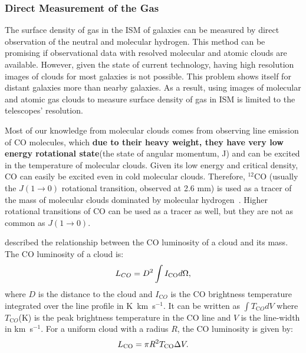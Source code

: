 \subsubsection{Direct Measurement of the Gas}

The surface density of gas in the ISM of galaxies can be measured by direct observation of the neutral and molecular hydrogen.
This method can be promising if observational data with resolved molecular and atomic clouds are available.
However, given the state of current technology, having high resolution images of clouds for most galaxies is not possible. 
This problem shows itself for distant galaxies more than nearby galaxies. 
As a result, using images of molecular and atomic gas clouds to measure surface density of gas in ISM is limited to the telescopes' resolution. 
 
Most of our knowledge from molecular clouds comes from observing line emission of CO molecules, which {\bf due to their heavy weight, they have very low energy rotational state}(the state of angular momentum, J) and can be excited in the temperature of molecular clouds. %
Given its low energy and critical density, CO can easily be excited even in cold molecular clouds.
Therefore, $^{12}$CO (usually the $J(1\rightarrow 0)$ rotational transition, observed at 2.6 mm) is used as a tracer of the mass of molecular clouds dominated by molecular hydrogen~\citep[e.g.][]{Sanders84}.
Higher rotational transitions of CO can be used as a tracer as well, but they are not as common as $J(1\rightarrow 0)$.

\cite{Young91} described the relationship between the CO luminosity of a cloud and its mass. The CO luminosity of a cloud is:
\begin{equation}
L_{CO} = D^2 \int I_{\rm CO} d\Omega, 
\end{equation}
where $D$ is the distance to the cloud and $I_{\mathrm CO}$ is the CO brightness temperature integrated over the line profile in K~km~s$^{-1}$.
It can be written as ${\int T_{\mathrm CO} dV}$ where $T_{\mathrm CO}$(K) is the peak brightness temperature in the CO line and $V$ is the line-width in km~s$^{-1}$.
For a uniform cloud with a radius $R$, the CO luminosity is given by:
 \begin{equation}
L_{\rm CO} = \pi R^2 T_{\rm CO} \Delta V.
\end{equation}

